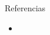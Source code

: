 \documentclass[final,t]{beamer}
\begin{document}
\begin{columns}[t]
\begin{column}{.33\linewidth}
% 
%



\begin{block}{Referencias}

\begin{itemize}
\item
\end{itemize}
\vspace{-0.2cm}
\end{block}

\end{column}

\end{columns}
\end{document}
